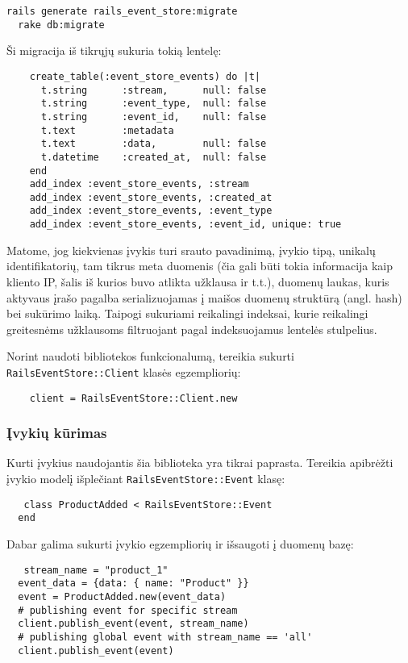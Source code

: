\begin{lstlisting}[]
  rails generate rails_event_store:migrate
  rake db:migrate
\end{lstlisting}

Ši migracija iš tikrųjų sukuria tokią lentelę:

\begin{lstlisting}
    create_table(:event_store_events) do |t|
      t.string      :stream,      null: false
      t.string      :event_type,  null: false
      t.string      :event_id,    null: false
      t.text        :metadata
      t.text        :data,        null: false
      t.datetime    :created_at,  null: false
    end
    add_index :event_store_events, :stream
    add_index :event_store_events, :created_at
    add_index :event_store_events, :event_type
    add_index :event_store_events, :event_id, unique: true
\end{lstlisting}

Matome, jog kiekvienas įvykis turi srauto pavadinimą, įvykio tipą, unikalų identifikatorių, tam tikrus meta duomenis (čia gali būti tokia informacija kaip kliento IP, šalis iš kurios buvo atlikta užklausa ir t.t.), duomenų laukas, kuris aktyvaus įrašo pagalba serializuojamas į maišos duomenų struktūrą (angl. hash) bei sukūrimo laiką. Taipogi sukuriami reikalingi indeksai, kurie reikalingi greitesnėms užklausoms filtruojant pagal indeksuojamus lentelės stulpelius.

Norint naudoti bibliotekos funkcionalumą, tereikia sukurti \lstinline|RailsEventStore::Client| klasės egzempliorių:

\begin{lstlisting}[]
    client = RailsEventStore::Client.new
\end{lstlisting}

\subsubsection{Įvykių kūrimas}

Kurti įvykius naudojantis šia biblioteka yra tikrai paprasta. Tereikia apibrėžti įvykio modelį išplečiant \lstinline{RailsEventStore::Event} klasę:

\begin{lstlisting}[]
   class ProductAdded < RailsEventStore::Event 
  end
\end{lstlisting}

Dabar galima sukurti įvykio egzempliorių ir išsaugoti į duomenų bazę:

\begin{lstlisting}[]
   stream_name = "product_1" 
  event_data = {data: { name: "Product" }}
  event = ProductAdded.new(event_data)
  # publishing event for specific stream
  client.publish_event(event, stream_name)
  # publishing global event with stream_name == 'all'
  client.publish_event(event)
\end{lstlisting}


